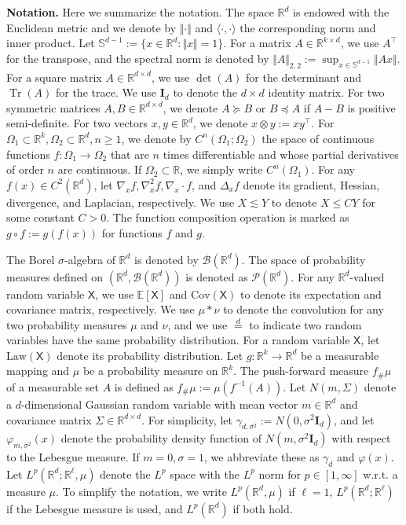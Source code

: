 \documentclass[twoside,11pt]{article}
\def\rmI{{\mathbf{I}}}
\def\sR{{\mathbb{R}}}
\newcommand{\E}{\mathbb{E}}
\newcommand{\Cov}{\mathrm{Cov}}
\DeclareMathOperator{\Tr}{Tr}
\numberwithin{equation}{section}
\begin{document}
\noindent \textbf{Notation.}
Here we summarize the notation.
The space $\sR^d$ is endowed with the Euclidean metric and we denote by $\Vert \cdot \Vert$ and $\langle \cdot, \cdot \rangle$ the corresponding norm and inner product.
Let $\mathbb{S}^{d-1} := \{x \in \sR^d : \Vert x \Vert = 1\}$.
For a matrix $A \in \sR^{k \times d}$, we use $A^{\top}$ for the transpose, and the spectral norm is denoted by $\Vert A \Vert_{2, 2} := \sup_{x \in \mathbb{S}^{d-1}} \Vert Ax \Vert$.
For a square matrix $A \in \sR^{d \times d}$, we use $\det(A)$ for the determinant and $\Tr(A)$ for the trace.
We use $\rmI_d$ to denote the $d \times d$ identity matrix.
For two symmetric matrices $A, B \in \sR^{d \times d}$, we denote $A \succeq B$ or $B \preceq A$ if $A - B$ is positive semi-definite.
For two vectors $x, y \in \sR^d$, we denote $x \otimes y := x y^{\top}$.
For $\Omega_1 \subset \sR^k, \Omega_2 \subset \sR^d, n \ge 1$, we denote by $C^n(\Omega_1; \Omega_2)$ the space of continuous functions $f: \Omega_1 \to \Omega_2$ that are $n$ times differentiable and whose partial derivatives of order $n$ are continuous.
If $\Omega_2 \subset \sR$, we simply write $C^n(\Omega_1)$.
For any $f(x) \in C^2(\sR^d)$, let $\nabla_x f, \nabla^2_x f, \nabla_x \cdot f$, and $\Delta_x f$ denote its gradient, Hessian, divergence, and Laplacian, respectively.
We use $X \lesssim Y$
to denote $X \le C Y$ for some constant $C > 0$.
The function composition operation is marked as $g \circ f := g(f(x))$ for functions $f$ and $g$.

The Borel $\sigma$-algebra of $\sR^d$ is denoted by $\mathcal{B}(\sR^d)$.
The space of probability measures defined on $(\sR^d, \mathcal B(\sR^d))$ is denoted as $\mathcal{P}(\sR^d)$.
For any $\sR^d$-valued random variable $\mathsf{X}$, we use $\E[\mathsf{X}]$ and $\Cov(\mathsf{X})$ to denote its expectation and covariance matrix, respectively.
We use $\mu * \nu$ to denote the convolution for any two probability measures $\mu$ and $\nu$, and we use $\overset{d}{=}$ to indicate two random variables have the same probability distribution.
For a random variable $\mathsf{X}$, let $\mathrm{Law}(\mathsf{X})$ denote its probability distribution.
Let $g: \sR^k \to \sR^d$ be a measurable mapping and $\mu$ be a probability measure on $\sR^k$. The push-forward measure $f_{\#} \mu$ of a measurable set $A$ is defined as $f_{\#} \mu := \mu(f^{-1} (A))$.
Let $N (m, \Sigma)$ denote a $d$-dimensional Gaussian random variable with mean vector $m \in \sR^d$ and covariance matrix $\Sigma \in \sR^{d \times d}$.
For simplicity, let $\gamma_{d, \sigma^2} := N(0, \sigma^2 \rmI_d)$,
and let $\varphi_{m, \sigma^2}(x)$ denote the probability density function of $N (m, \sigma^2 \rmI_d)$ with respect to the Lebesgue measure.
If $m = 0, \sigma = 1$, we abbreviate these as $\gamma_d$ and $\varphi(x)$.
Let $L^p(\sR^d; \sR^{\ell}, \mu)$ denote the $L^p$ space with the $L^p$ norm for $p \in [1, \infty]$ w.r.t. a measure $\mu$.
To simplify the notation, we write $L^p(\sR^d, \mu)$ if $\ell = 1$, $L^p(\sR^d; \sR^{\ell})$ if the Lebesgue measure is used, and $L^p(\sR^d)$ if both hold.
\end{document}
